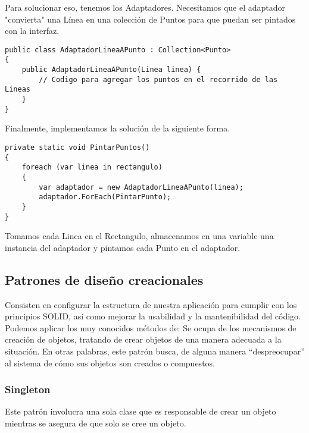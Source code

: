 \documentclass[twoside,twocolumn]{article}
\begin{document}
Para solucionar eso, tenemos los Adaptadores. Necesitamos que el adaptador "convierta" una Línea en una colección de Puntos para que puedan ser pintados con la interfaz.
\lstset{style=sharpc}
\begin{lstlisting}
public class AdaptadorLineaAPunto : Collection<Punto>
{
    public AdaptadorLineaAPunto(Linea linea) {
        // Codigo para agregar los puntos en el recorrido de las Lineas
    }
}
\end{lstlisting}

Finalmente, implementamos la solución de la siguiente forma.
\lstset{style=sharpc}
\begin{lstlisting}
private static void PintarPuntos()
{
    foreach (var linea in rectangulo)
    {
        var adaptador = new AdaptadorLineaAPunto(linea);
        adaptador.ForEach(PintarPunto);
    }  
}
\end{lstlisting}

Tomamos cada Linea en el Rectangulo, almacenamos en una variable una instancia del adaptador y pintamos cada Punto en el adaptador.

\subsection{Patrones de diseño creacionales}


Consisten en configurar la estructura de nuestra aplicación para cumplir con los principios SOLID, así como mejorar la usabilidad y la mantenibilidad del código. Podemos aplicar los muy conocidos métodos de:
Se ocupa de los mecanismos de creación de objetos, tratando de crear objetos de una manera adecuada a la situación.
En otras palabras, este patrón busca, de alguna manera “despreocupar” al sistema de cómo sus objetos son creados o compuestos.



\subsubsection{Singleton}


Este patrón involucra una sola clase que es responsable de crear un objeto mientras se asegura de que solo se cree un objeto. 
\end{document}
